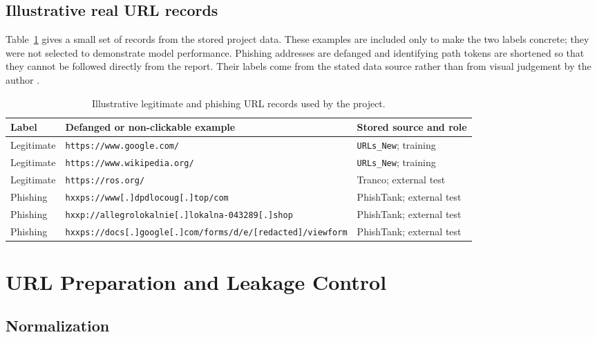 \subsection{Illustrative real URL records}

Table~\ref{tab:method-real-url-examples} gives a small set of records from the
stored project data. These examples are included only to make the two labels
concrete; they were not selected to demonstrate model performance. Phishing
addresses are defanged and identifying path tokens are shortened so that they
cannot be followed directly from the report. Their labels come from the stated
data source rather than from visual judgement by the author
\citep{phishtankdeveloper}.

\begin{table}[htbp]
\centering
\caption{Illustrative legitimate and phishing URL records used by the project.}
\label{tab:method-real-url-examples}
\small
\begin{tabular}{@{}p{}p{}p{}@{}}
\toprule
Label & Defanged or non-clickable example & Stored source and role \\
\midrule
Legitimate & \nolinkurl{https://www.google.com/} & \texttt{URLs\_New}; training \\
Legitimate & \nolinkurl{https://www.wikipedia.org/} & \texttt{URLs\_New}; training \\
Legitimate & \nolinkurl{https://ros.org/} & Tranco; external test \\
Phishing & \nolinkurl{hxxps://www[.]dpdlocoug[.]top/com} & PhishTank; external test \\
Phishing & \nolinkurl{hxxp://allegrolokalnie[.]lokalna-043289[.]shop} & PhishTank; external test \\
Phishing & \nolinkurl{hxxps://docs[.]google[.]com/forms/d/e/[redacted]/viewform} & PhishTank; external test \\
\bottomrule
\end{tabular}
\end{table}

\section{URL Preparation and Leakage Control}

\subsection{Normalization}

